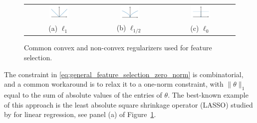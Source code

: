  \begin{figure}[ht!]
    \centering
    \begin{tabular}{ccc}
        \includegraphics[width=0.3\textwidth]{figures/l1_regularizer.pdf}
&
           \includegraphics[width=0.3\textwidth]{figures/lh_regularizer.pdf}
    &
    \includegraphics[width=0.3\textwidth]{figures/l0_regularizer.pdf}\\
              (a) $\ell_1$  & (b) $\ell_{1/2}$ & (c) $\ell_0$
    \end{tabular}
    \caption{Common convex and non-convex regularizers used for feature selection.}
    \label{fig:regularizers}
\end{figure}


The constraint in \eqref{eq:general_feature_selection_zero_norm} is 
combinatorial, and a common workaround is to relax it to a one-norm constraint, 
with $\|\theta\|_1$ equal to the sum of absolute values of the entries of $\theta$. 
The best-known example of this approach is the least absolute square shrinkage operator (LASSO) studied by \cite{Tibshirani1996} for linear regression, 
see panel (a) of Figure~\ref{fig:regularizers}.
 
  
